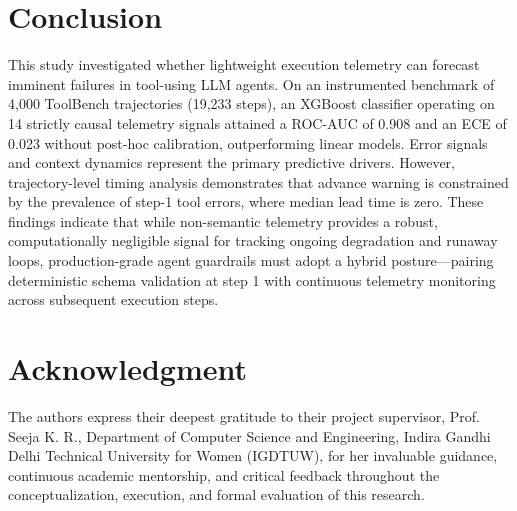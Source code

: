 \documentclass[journal,compsoc]{IEEEtran}
\begin{document}
\section{Conclusion}
This study investigated whether lightweight execution telemetry can forecast imminent failures in tool-using LLM agents. On an instrumented benchmark of 4,000 ToolBench trajectories (19,233 steps), an XGBoost classifier operating on 14 strictly causal telemetry signals attained a ROC-AUC of 0.908 and an ECE of 0.023 without post-hoc calibration, outperforming linear models. Error signals and context dynamics represent the primary predictive drivers. However, trajectory-level timing analysis demonstrates that advance warning is constrained by the prevalence of step-1 tool errors, where median lead time is zero. These findings indicate that while non-semantic telemetry provides a robust, computationally negligible signal for tracking ongoing degradation and runaway loops, production-grade agent guardrails must adopt a hybrid posture---pairing deterministic schema validation at step 1 with continuous telemetry monitoring across subsequent execution steps.

\section*{Acknowledgment}
The authors express their deepest gratitude to their project supervisor, Prof. Seeja K. R., Department of Computer Science and Engineering, Indira Gandhi Delhi Technical University for Women (IGDTUW), for her invaluable guidance, continuous academic mentorship, and critical feedback throughout the conceptualization, execution, and formal evaluation of this research.



\end{document}
